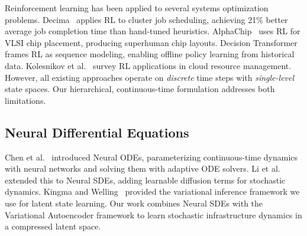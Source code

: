 \documentclass[conference,10pt]{IEEEtran}
\begin{document}
Reinforcement learning has been applied to several systems optimization problems. Decima~\cite{mao2019learning} applies RL to cluster job scheduling, achieving 21\% better average job completion time than hand-tuned heuristics. AlphaChip~\cite{mirhoseini2021graph} uses RL for VLSI chip placement, producing superhuman chip layouts. Decision Transformer~\cite{chen2021decision} frames RL as sequence modeling, enabling offline policy learning from historical data. Kolesnikov et al.~\cite{kolesnikov2024survey} survey RL applications in cloud resource management. However, all existing approaches operate on \emph{discrete} time steps with \emph{single-level} state spaces. Our hierarchical, continuous-time formulation addresses both limitations.

\subsection{Neural Differential Equations}

Chen et al.~\cite{chen2018neural} introduced Neural ODEs, parameterizing continuous-time dynamics with neural networks and solving them with adaptive ODE solvers. Li et al.~\cite{li2020scalable} extended this to Neural SDEs, adding learnable diffusion terms for stochastic dynamics. Kingma and Welling~\cite{kingma2014vae} provided the variational inference framework we use for latent state learning. Our work combines Neural SDEs with the Variational Autoencoder framework to learn stochastic infrastructure dynamics in a compressed latent space.
\end{document}
